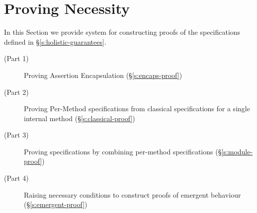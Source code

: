 \section{Proving Necessity}
\label{s:inference}

In this Section we provide  system for constructing 
proofs of the \Nec specifications defined in \S \ref{s:holistic-guarantees}.
\begin{description} 
\item[(Part 1)]
Proving Assertion Encapsulation (\S \ref{s:encaps-proof})
\item[(Part 2)]
Proving Per-Method \Nec specifications from classical specifications for a single internal method (\S \ref{s:classical-proof})
\item[(Part 3)]
Proving  \Nec specifications by combining per-method \Nec specifications (\S \ref{s:module-proof})
\item[(Part 4)]
Raising necessary conditions to construct proofs of emergent behaviour (\S \ref{s:emergent-proof})
\end{description}

